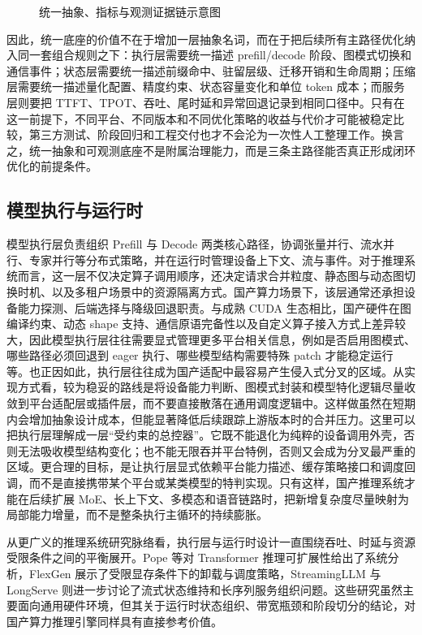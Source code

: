 \begin{figure}[t]
\centering
\resizebox{0.64\linewidth}{!}{}
\caption{统一抽象、指标与观测证据链示意图}
\label{fig:observability-contract-stack}
\end{figure}

因此，统一底座的价值不在于增加一层抽象名词，而在于把后续所有主路径优化纳入同一套组合规则之下：执行层需要统一描述 prefill/decode 阶段、图模式切换和通信事件；状态层需要统一描述前缀命中、驻留层级、迁移开销和生命周期；压缩层需要统一描述量化配置、精度约束、状态容量变化和单位 token 成本；而服务层则要把 TTFT、TPOT、吞吐、尾时延和异常回退记录到相同口径中。只有在这一前提下，不同平台、不同版本和不同优化策略的收益与代价才可能被稳定比较，第三方测试、阶段回归和工程交付也才不会沦为一次性人工整理工作。换言之，统一抽象和可观测底座不是附属治理能力，而是三条主路径能否真正形成闭环优化的前提条件。

\subsection{模型执行与运行时}

模型执行层负责组织 Prefill 与 Decode 两类核心路径，协调张量并行、流水并行、专家并行等分布式策略，并在运行时管理设备上下文、流与事件。对于推理系统而言，这一层不仅决定算子调用顺序，还决定请求合并粒度、静态图与动态图切换时机、以及多租户场景中的资源隔离方式。国产算力场景下，该层通常还承担设备能力探测、后端选择与降级回退职责。与成熟 CUDA 生态相比，国产硬件在图编译约束、动态 shape 支持、通信原语完备性以及自定义算子接入方式上差异较大，因此模型执行层往往需要显式管理更多平台相关信息，例如是否启用图模式、哪些路径必须回退到 eager 执行、哪些模型结构需要特殊 patch 才能稳定运行等。也正因如此，执行层往往成为国产适配中最容易产生侵入式分叉的区域。从实现方式看，较为稳妥的路线是将设备能力判断、图模式封装和模型特化逻辑尽量收敛到平台适配层或插件层，而不要直接散落在通用调度逻辑中。这样做虽然在短期内会增加抽象设计成本，但能显著降低后续跟踪上游版本时的合并压力。这里可以把执行层理解成一层“受约束的总控器”。它既不能退化为纯粹的设备调用外壳，否则无法吸收模型结构变化；也不能无限吞并平台特例，否则又会成为分叉最严重的区域。更合理的目标，是让执行层显式依赖平台能力描述、缓存策略接口和调度回调，而不是直接携带某个平台或某类模型的特判实现。只有这样，国产推理系统才能在后续扩展 MoE、长上下文、多模态和语音链路时，把新增复杂度尽量映射为局部能力增量，而不是整条执行主循环的持续膨胀。

从更广义的推理系统研究脉络看，执行层与运行时设计一直围绕吞吐、时延与资源受限条件之间的平衡展开。Pope 等对 Transformer 推理可扩展性给出了系统分析，FlexGen 展示了受限显存条件下的卸载与调度策略，StreamingLLM 与 LongServe 则进一步讨论了流式状态维持和长序列服务组织问题\citep{pope2023efficiently,sheng2023flexgen,xiao2023streamingllm,longserve2024}。这些研究虽然主要面向通用硬件环境，但其关于运行时状态组织、带宽瓶颈和阶段切分的结论，对国产算力推理引擎同样具有直接参考价值。

